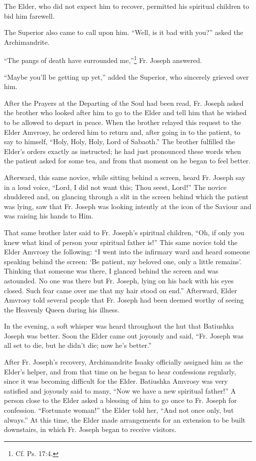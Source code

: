 The Elder, who did not expect him to recover, permitted his spiritual children to bid him farewell.

The Superior also came to call upon him. ``Well, is it bad with you?'' asked the Archimandrite.

``The pangs of death have surrounded me,''\footnote{Cf. Ps. 17:4.} Fr. Joseph answered.

``Maybe you'll be getting up yet,'' added the Superior, who sincerely grieved over him.

After the Prayers at the Departing of the Soul had been read, Fr. Joseph asked the brother who looked after him to go to the Elder and tell him that he wished to be allowed to depart in peace. When the brother relayed this request to the Elder Amvrosy, he ordered him to return and, after going in to the patient, to say to himself, ``Holy, Holy, Holy, Lord of Sabaoth.'' The brother fulfilled the Elder's orders exactly as instructed; he had just pronounced these words when the patient asked for some tea, and from that moment on he began to feel better.

Afterward, this same novice, while sitting behind a screen, heard Fr. Joseph say in a loud voice, ``Lord, I did not want this; Thou seest, Lord!'' The novice shuddered and, on glancing through a slit in the screen behind which the patient was lying, saw that Fr. Joseph was looking intently at the icon of the Saviour and was raising his hands to Him.

That same brother later said to Fr. Joseph's spiritual children, ``Oh, if only you knew what kind of person your spiritual father is!'' This same novice told the Elder Amvrosy the following: ``I went into the infirmary ward and heard someone speaking behind the screen: `Be patient, my beloved one, only a little remains'. Thinking that someone was there, I glanced behind the screen and was astounded. No one was there but Fr. Joseph, lying on his back with his eyes closed. Such fear came over me that my hair stood on end.'' Afterward, Elder Amvrosy told several people that Fr. Joseph had been deemed worthy of seeing the Heavenly Queen during his illness.

In the evening, a soft whisper was heard throughout the hut that Batiushka Joseph was better. Soon the Elder came out joyously and said, ``Fr. Joseph was all set to die, but he didn't die; now he's better.''

After Fr. Joseph's recovery, Archimandrite Isaaky officially assigned him as the Elder's helper, and from that time on he began to hear confessions regularly, since it was becoming difficult for the Elder. Batiushka Amvrosy was very satisfied and joyously said to many, ``Now we have a new spiritual father!'' A person close to the Elder asked a blessing of him to go once to Fr. Joseph for confession. ``Fortunate woman!'' the Elder told her, ``And not once only, but always.'' At this time, the Elder made arrangements for an extension to be built downstairs, in which Fr. Joseph began to receive visitors.

